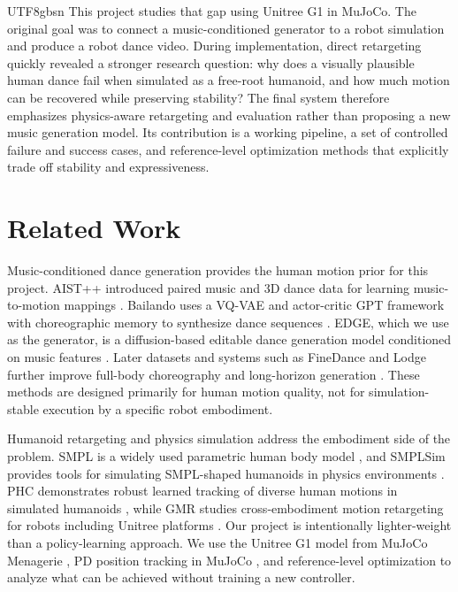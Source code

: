 \documentclass[conference]{IEEEtran}
\begin{document}
\begin{CJK*}{UTF8}{gbsn}
This project studies that gap using Unitree G1 in MuJoCo. The original goal was to connect a music-conditioned generator to a robot simulation and produce a robot dance video. During implementation, direct retargeting quickly revealed a stronger research question: why does a visually plausible human dance fail when simulated as a free-root humanoid, and how much motion can be recovered while preserving stability? The final system therefore emphasizes physics-aware retargeting and evaluation rather than proposing a new music generation model. Its contribution is a working pipeline, a set of controlled failure and success cases, and reference-level optimization methods that explicitly trade off stability and expressiveness.

\section{Related Work}
Music-conditioned dance generation provides the human motion prior for this project. AIST++ introduced paired music and 3D dance data for learning music-to-motion mappings \cite{li2021aistpp}. Bailando uses a VQ-VAE and actor-critic GPT framework with choreographic memory to synthesize dance sequences \cite{siyao2022bailando}. EDGE, which we use as the generator, is a diffusion-based editable dance generation model conditioned on music features \cite{tseng2023edge}. Later datasets and systems such as FineDance and Lodge further improve full-body choreography and long-horizon generation \cite{li2023finedance,li2024lodge}. These methods are designed primarily for human motion quality, not for simulation-stable execution by a specific robot embodiment.

Humanoid retargeting and physics simulation address the embodiment side of the problem. SMPL is a widely used parametric human body model \cite{loper2015smpl}, and SMPLSim provides tools for simulating SMPL-shaped humanoids in physics environments \cite{luo2024smplsim}. PHC demonstrates robust learned tracking of diverse human motions in simulated humanoids \cite{luo2023phc}, while GMR studies cross-embodiment motion retargeting for robots including Unitree platforms \cite{araujo2025gmr}. Our project is intentionally lighter-weight than a policy-learning approach. We use the Unitree G1 model from MuJoCo Menagerie \cite{mujocomenagerie}, PD position tracking in MuJoCo \cite{todorov2012mujoco}, and reference-level optimization to analyze what can be achieved without training a new controller.


\end{CJK*}
\end{document}

